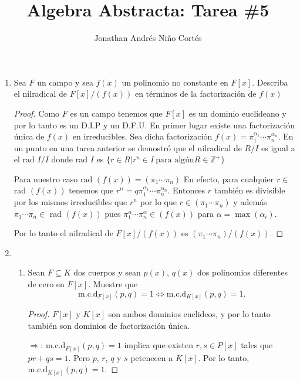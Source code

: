 \documentclass[letter,twoside,12pt]{article}
\title{Algebra Abstracta: Tarea \#5}
\author{Jonathan Andrés Niño Cortés}
\begin{document}
\maketitle

\begin{enumerate}
\item Sea $ F $ un campo y sea $ f(x) $ un polinomio no constante en $ F[x] $. Describa el nilradical de $ F[x]/(f(x)) $ en términos de la factorización de $ f(x) $

\begin{proof}
Como $ F $ es un campo tenemos que $ F[x] $ es un dominio euclideano y por lo tanto es un D.I.P y un D.F.U. En primer lugar existe una factorización única de $ f(x) $ en irreducibles. Sea dicha factorización $ f(x)=\pi_1^{\alpha_1} \cdots \pi_n^{\alpha_n} $. En un punto en una tarea anterior se demostró que el nilradical de $R/I$ es igual a el $ \text{rad } I /I$ donde rad $ I $ es $ \{r \in R| r^n \in I\ \text{para algún} R \in \mathbb{Z}^+\} $

Para nuestro caso rad $(f(x)) = (\pi_1\cdots \pi_n)$ En efecto, para cualquier $ r \in  $ rad $ (f(x)) $ tenemos que $ r^n = q\pi_1^{\alpha_1} \cdots \pi_n^{\alpha_n}$. Entonces $r$ también es divisible por los mismos irreducibles que $r^n$ por lo que $ r \in (\pi_1 \cdots \pi_n) $ y además $ \pi_1 \cdots \pi_n \in  $ rad $ (f(x)) $ pues  $ \pi_1^{\alpha} \cdots \pi_n ^\alpha \in (f(x))$ para $ \alpha = \max(\alpha_i)$. 

Por lo tanto el nilradical de $ F[x]/(f(x)) $ es $ (\pi_1\cdots \pi_n)/(f(x)) $.
\end{proof}

\item \begin{enumerate}
\item Sean $ F \subseteq K $ dos cuerpos y sean $ p(x) $, $ q(x) $ dos polinomios diferentes de cero en $ F[x] $. Muestre que
\begin{equation}
\text{m.c.d}_{F [x]}(p, q) = 1 \Longleftrightarrow \text{m.c.d}_{K[x]}(p, q) = 1. \nonumber
\end{equation}
\begin{proof}

$ F[x] $ y $ K[x] $ son ambos dominios euclideos, y por lo tanto también son dominios de factorización única.

$ \Rightarrow $: $ \text{m.c.d}_{F [x]}(p, q) = 1 $ implica que existen $ r, s  \in P[x]$ tales que $ pr+qs=1$. Pero $ p $, $ r $, $ q $ y $ s $ petenecen a $ K[x] $. Por lo tanto, $ \text{m.c.d}_{K [x]}(p, q) = 1 $.


\end{proof}
\end{enumerate}
\end{enumerate}
\end{document}

